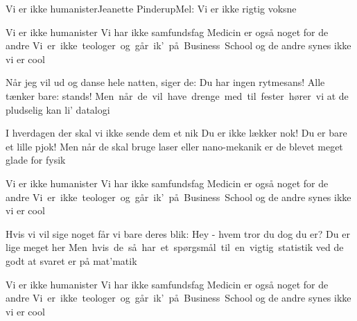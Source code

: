 \begin{sang}{Vi er ikke humanister}{Jeanette Pinderup}{Mel: Vi er ikke
rigtig voksne}

\begin{omkvaed}
Vi er ikke humanister
Vi har ikke samfundsfag
Medicin er også noget for de andre
\hbox{Vi er ikke teologer og går ik' på Business School}
og de andre synes ikke vi er cool
\end{omkvaed}

\begin{vers}
Når jeg vil ud og danse hele natten, siger de:
Du har ingen rytmesans!
Alle tænker bare: stands!
\hbox{Men når de vil have drenge med til fester hører vi}
at de pludselig kan li' datalogi
\end{vers}

\begin{vers}
I hverdagen der skal vi ikke sende dem et nik
Du er ikke lækker nok!
Du er bare et lille pjok!
Men når de skal bruge laser eller nano-mekanik
er de blevet meget glade for fysik
\end{vers}

\begin{omkvaed}
Vi er ikke humanister
Vi har ikke samfundsfag
Medicin er også noget for de andre
\hbox{Vi er ikke teologer og går ik' på Business School}
og de andre synes ikke vi er cool
\end{omkvaed}

\begin{vers}
Hvis vi vil sige noget får vi bare deres blik:
Hey - hvem tror du dog du er?
Du er lige meget her
\hbox{Men hvis de så har et spørgsmål til en vigtig statistik}
ved de godt at svaret er på mat'matik
\end{vers}

\begin{omkvaed}
Vi er ikke humanister
Vi har ikke samfundsfag
Medicin er også noget for de andre
\hbox{Vi er ikke teologer og går ik' på Business School}
og de andre synes ikke vi er cool
\end{omkvaed}

\end{sang}